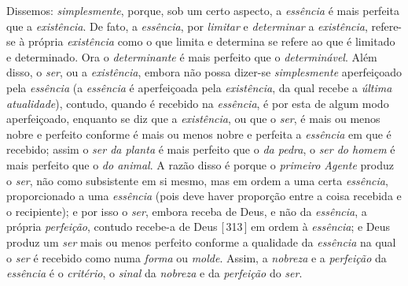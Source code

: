 \documentclass[12pt,a4paper]{article}
\newcommand{\pg}[1]{\thinspace\textup{[\,#1\,]}\thinspace}
\begin{document}
{  Dissemos: \emph{simplesmente}, porque, sob um certo aspecto, a \emph{essência}
  é mais perfeita que a \emph{existência}. De fato, a \emph{essência}, por
  \emph{limitar} e \emph{determinar} a \emph{existência}, refere-se à própria
  \emph{existência} como o que limita e determina se refere ao que é limitado e
  determinado. Ora o \emph{determinante} é mais perfeito que o
  \emph{determinável}. \textemdash{} Além disso, o \emph{ser}, ou a
  \emph{existência}, embora não possa dizer-se \emph{simplesmente}
  aperfeiçoado pela \emph{essência} (a \emph{essência} é aperfeiçoada pela
  \emph{existência}, da qual recebe a \emph{última atualidade}), contudo,
  quando é recebido na \emph{essência}, é por esta de algum modo aperfeiçoado,
  enquanto se diz que a \emph{existência}, ou que o \emph{ser}, é mais ou menos
  nobre e perfeito conforme é mais ou menos nobre e perfeita a \emph{essência}
  em que é recebido; assim o \emph{ser da planta} é mais perfeito que o \emph{da
  pedra}, o \emph{ser do homem} é mais perfeito que o \emph{do animal}.
  \textemdash{} A razão disso é porque o \emph{primeiro Agente} produz o
  \emph{ser}, não como subsistente em si mesmo, mas em ordem a uma certa
  \emph{essência}, proporcionado a uma \emph{essência} (pois deve haver
  proporção entre a coisa recebida e o recipiente); e por isso o \emph{ser},
  embora receba de Deus, e não da \emph{essência}, a própria \emph{perfeição},
  contudo recebe-a de Deus \pg{313} em ordem à \emph{essência}; e Deus produz
  um \emph{ser} mais ou menos perfeito conforme a qualidade da \emph{essência}
  na qual o \emph{ser} é recebido como numa \emph{forma} ou \emph{molde}.
  Assim, a \emph{nobreza} e a \emph{perfeição} da \emph{essência} é o
  \emph{critério}, o \emph{sinal} da \emph{nobreza} e da \emph{perfeição} do
  \emph{ser}.}
\end{document}
